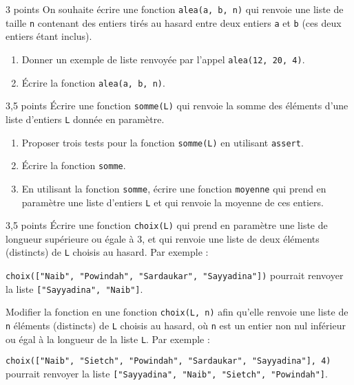 \documentclass[a4paper,dvipsnames]{article}
\begin{document}
\medskip

\begin{exercice}{3 points}{}
  On souhaite écrire une fonction \texttt{alea(a, b, n)} qui renvoie une liste de taille \texttt{n} contenant des entiers tirés au hasard entre deux entiers \texttt{a} et \texttt{b} (ces deux entiers étant inclus).
  \begin{enumerate}
    \item Donner un exemple de liste renvoyée par l'appel \texttt{alea(12, 20, 4)}.
    \item Écrire la fonction \texttt{alea(a, b, n)}.
  \end{enumerate}
\end{exercice}

\medskip

\begin{exercice}{3,5 points}{}
  Écrire une fonction \texttt{somme(L)} qui renvoie la somme des éléments d'une liste d'entiers \texttt{L} donnée en paramètre.
  \begin{enumerate}
    \item Proposer trois tests pour la fonction \texttt{somme(L)} en utilisant \texttt{assert}.
    \item Écrire la fonction \texttt{somme}.
    \item En utilisant la fonction \texttt{somme}, écrire une fonction \texttt{moyenne} qui prend en paramètre une liste d'entiers \texttt{L} et qui renvoie la moyenne de ces entiers.
  \end{enumerate}
\end{exercice}

\medskip

\begin{exercice}{3,5 points}{}
  Écrire une fonction \texttt{choix(L)} qui prend en paramètre une liste de longueur supérieure ou égale à $3$, et qui renvoie une liste de deux éléments (distincts) de \texttt{L} choisis au hasard. Par exemple :

  \begin{center}
    \texttt{choix(["Naib", "Powindah", "Sardaukar", "Sayyadina"])} pourrait renvoyer la liste \texttt{["Sayyadina", "Naib"]}.
  \end{center}

  Modifier la fonction en une fonction \texttt{choix(L, n)} afin qu'elle renvoie une liste de \texttt{n} éléments (distincts) de \texttt{L} choisis au hasard, où \texttt{n} est un entier non nul inférieur ou égal à la longueur de la liste \texttt{L}. Par exemple :

  \begin{center}
    \texttt{choix(["Naib", "Sietch", "Powindah", "Sardaukar", "Sayyadina"], 4)} pourrait renvoyer la liste \texttt{["Sayyadina", "Naib", "Sietch", "Powindah"]}.
  \end{center}
\end{exercice}
\end{document}

